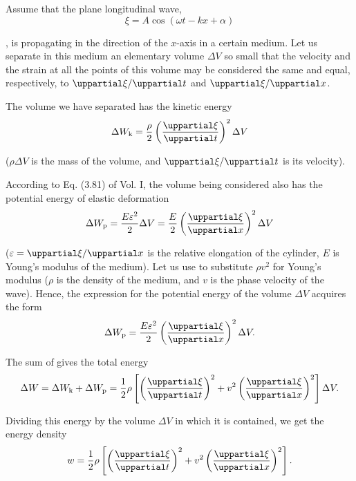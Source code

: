 Assume that the plane longitudinal wave,
\begin{equation*}
	\xi = A \cos(\omega t - kx + \alpha)
\end{equation*}

, is propagating in the direction of the $x$-axis in a certain medium.
Let us separate in this medium an elementary volume $\Delta{V}$ so small that the velocity and the strain at all the points of this volume may be considered the same and equal, respectively, to $\diffpartialin{\xi}{t}$ and $\diffpartialin{\xi}{x}$.

The volume we have separated has the kinetic energy
\begin{equation}\label{eq:14_38}
	\ab{\Delta{W}}{k} = \frac{\rho}{2} \parenthesis{\diffpartial{\xi}{t}}^2 \Delta{V}
\end{equation}

\noindent
($\rho\Delta{V}$ is the mass of the volume, and $\diffpartialin{\xi}{t}$ is its velocity).

According to Eq. (3.81) of Vol. I, the volume being considered also has the potential energy of elastic deformation
\begin{equation*}
	\ab{\Delta{W}}{p} = \frac{E\varepsilon^2}{2} \Delta{V}  = \frac{E}{2} \parenthesis{\diffpartial{\xi}{x}}^2 \Delta{V}
\end{equation*}

\noindent
($\varepsilon=\diffpartialin{\xi}{x}$ is the relative elongation of the cylinder, $E$ is Young's
modulus of the medium).
Let us use  to substitute $\rho v^2$ for Young's modulus ($\rho$ is the density of the medium, and $v$ is the phase velocity of the wave).
Hence, the expression for the potential energy of the volume $\Delta{V}$ acquires the form
\begin{equation}\label{eq:14_39}
	\ab{\Delta{W}}{p} = \frac{E\varepsilon^2}{2} \parenthesis{\diffpartial{\xi}{x}}^2 \Delta{V}.
\end{equation}

The sum of  gives the total energy
\begin{equation}\label{eq:14_40}
	\Delta{W} = \ab{\Delta{W}}{k} + \ab{\Delta{W}}{p} = \frac{1}{2} \rho \bracket{ \parenthesis{\diffpartial{\xi}{t}}^2 + v^2 \parenthesis{\diffpartial{\xi}{x}}^2 } \Delta{V}.
\end{equation}

\noindent
Dividing this energy by the volume $\Delta{V}$ in which it is contained, we get the energy density
\begin{equation}\label{eq:14_41}
	w = \frac{1}{2} \rho \bracket{ \parenthesis{\diffpartial{\xi}{t}}^2 + v^2 \parenthesis{\diffpartial{\xi}{x}}^2 }.
\end{equation}

